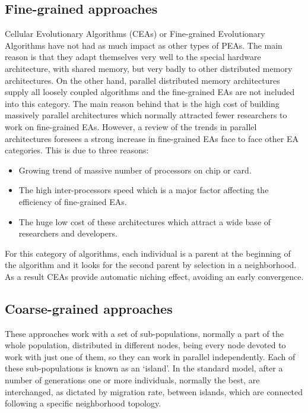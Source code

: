 \documentclass{article}
\begin{document}
\subsection{Fine-grained approaches}
\label{subsec:finegrainedapproaches}

Cellular Evolutionary Algorithms (CEAs) or Fine-grained Evolutionary
Algorithms have not had as much impact as other types of PEAs. The
main reason is that they adapt themselves very well to the special
hardware architecture, with shared memory, but very badly to other
distributed memory architectures. On the other hand, parallel
distributed memory architectures supply all loosely coupled algorithms
and the fine-grained EAs are not included into this category. The main
reason behind that is the high cost of building massively parallel
architectures which normally attracted fewer researchers to work on
fine-grained EAs. However, a review of the trends in parallel
architectures foresees a strong increase in fine-grained EAs face to
face other EA categories. This is due to three reasons:

\begin{itemize}
\item Growing trend of massive number of processors on chip or card.
\item The high inter-processors speed which is a major factor affecting the efficiency of fine-grained EAs.
\item The huge low cost of these architectures which attract a wide base of researchers and developers.
\end{itemize}

For this category of algorithms, each individual is a parent at the beginning of the algorithm and it looks for the second parent by selection in a neighborhood. As a result CEAs provide automatic niching effect, avoiding an early convergence.

\subsection{Coarse-grained approaches}
\label{subsec:coarsegrainedapproaches}

These approaches work with a set of sub-populations, normally a part
of the whole population, distributed in different nodes, being every
node devoted to work with just one of them, so they can work in
parallel independently. Each of these sub-populations is known as an
`island'. In the standard model, after a number of generations one or
more individuals, normally the best, are interchanged, as dictated by
migration rate, between islands, which are connected following a
specific neighborhood topology.
\end{document}

